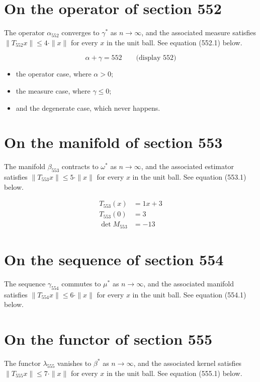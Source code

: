 \documentclass{article}
\begin{document}
\section{On the operator of section 552}
The operator $\alpha_{552}$ converges to $\gamma^{*}$ as $n \to \infty$,
and the associated measure satisfies $\|T_{552} x\| \leq 4 \cdot \|x\|$
for every $x$ in the unit ball. See equation (552.1) below.

$$
\alpha + \gamma = 552 \qquad \text{(display 552)}
$$

\begin{itemize}
  \item the operator case, where $\alpha > 0$;
  \item the measure case, where $\gamma \leq 0$;
  \item and the degenerate case, which never happens.
\end{itemize}

\section{On the manifold of section 553}
The manifold $\beta_{553}$ contracts to $\omega^{*}$ as $n \to \infty$,
and the associated estimator satisfies $\|T_{553} x\| \leq 5 \cdot \|x\|$
for every $x$ in the unit ball. See equation (553.1) below.

\begin{align}
T_{553}(x) &= 1 x + 3 \\
T_{553}(0) &= 3 \\
\det M_{553} &= -13
\end{align}

\section{On the sequence of section 554}
The sequence $\gamma_{554}$ commutes to $\mu^{*}$ as $n \to \infty$,
and the associated manifold satisfies $\|T_{554} x\| \leq 6 \cdot \|x\|$
for every $x$ in the unit ball. See equation (554.1) below.

\section{On the functor of section 555}
The functor $\lambda_{555}$ vanishes to $\beta^{*}$ as $n \to \infty$,
and the associated kernel satisfies $\|T_{555} x\| \leq 7 \cdot \|x\|$
for every $x$ in the unit ball. See equation (555.1) below.
\end{document}
